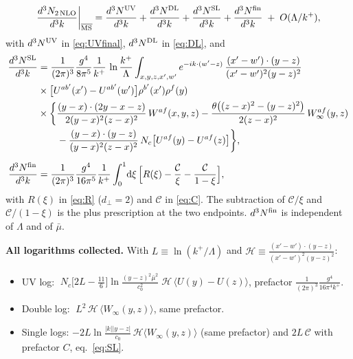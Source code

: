 \documentclass[11pt,a4paper]{article}
\newcommand{\dd}{\mathrm{d}}
\newcommand{\Nc}{N_c}
\newcommand{\MSbar}{\overline{\rm MS}}
\newcommand{\mubar}{\bar\mu}
\newcommand{\Winf}{W_\infty}
\newcommand{\cl}[1]{\big\langle #1\big\rangle}
\begin{document}
\begin{result}
\begin{equation}
\frac{d^{3}N_{2\,\rm NLO}}{d^{3}k}\bigg|_{\MSbar}
=\frac{d^3N^{\rm UV}}{d^3k}+\frac{d^3N^{\rm DL}}{d^3k}+\frac{d^3N^{\rm SL}}{d^3k}+\frac{d^3N^{\rm fin}}{d^3k}
\;+\;O(\Lambda/k^+),
\label{eq:final}
\end{equation}
with $d^3N^{\rm UV}$ in \eqref{eq:UVfinal}, $d^3N^{\rm DL}$ in \eqref{eq:DL}, and
\begin{align}
\frac{d^3N^{\rm SL}}{d^3k}&=\frac{1}{(2\pi)^3}\frac{g^4}{8\pi^5}\frac1{k^+}\,\ln\frac{k^+}{\Lambda}
\int_{x,y,z,x',w'}e^{-ik\cdot(w'-z)}\,\frac{(x'-w')\cdot(y-z)}{(x'-w')^2(y-z)^2}\notag\\
&\times\big[U^{ab'}(x')-U^{ab'}(w')\big]\rho^{b'}(x')\rho^f(y)\notag\\
&\times\bigg\{\frac{(y-x)\cdot(2y-x-z)}{2(y-x)^2(z-x)^2}\,W^{af}(x,y,z)
-\frac{\theta\big((z-x)^2-(y-z)^2\big)}{2(z-x)^2}\,\Winf^{af}(y,z)\notag\\
&\qquad-\frac{(y-x)\cdot(y-z)}{(y-x)^2(z-x)^2}\,\Nc\big[U^{af}(y)-U^{af}(z)\big]\bigg\},
\label{eq:SL}\\[6pt]
\frac{d^3N^{\rm fin}}{d^3k}&=\frac{1}{(2\pi)^3}\frac{g^4}{16\pi^5}\frac1{k^+}
\int_0^1\!\dd\xi\,\Big[R(\xi)-\frac{\mathcal C}{\xi}-\frac{\mathcal C}{1-\xi}\Big],
\label{eq:fin}
\end{align}
with $R(\xi)$ in \eqref{eq:R} ($d_\perp=2$) and $\mathcal C$ in \eqref{eq:C}. The subtraction of
$\mathcal C/\xi$ and $\mathcal C/(1-\xi)$ is the plus prescription at the two endpoints. $d^3N^{\rm fin}$ is independent
of $\Lambda$ and of $\mubar$.
\end{result}

\textbf{All logarithms collected.} With $L\equiv\ln(k^+/\Lambda)$ and
$\mathcal H\equiv\frac{(x'-w')\cdot(y-z)}{(x'-w')^2(y-z)^2}$:
\begin{itemize}
\item UV log: $\;\Nc\big[2L-\tfrac{11}{6}\big]\ln\frac{(y-z)^2\mubar^2}{c_0^2}\;\mathcal H\,\cl{U(y)-U(z)}$,
prefactor $\frac{1}{(2\pi)^3}\frac{g^4}{16\pi^4k^+}$.
\item Double log: $\;L^2\,\mathcal H\,\cl{\Winf(y,z)}$, same prefactor.
\item Single logs: $-2L\ln\frac{|k||y-z|}{c_0}\,\mathcal H\cl{\Winf(y,z)}$ (same prefactor) and
$2L\,\mathcal C$ with prefactor $C$, eq.~\eqref{eq:SL}.
\end{itemize}

\end{document}
